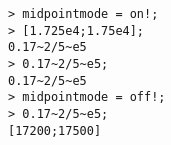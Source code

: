 \begin{center}\begin{minipage}{15cm}\begin{Verbatim}[frame=single]
> midpointmode = on!;
> [1.725e4;1.75e4];
0.17~2/5~e5
> 0.17~2/5~e5;
0.17~2/5~e5
> midpointmode = off!;
> 0.17~2/5~e5;
[17200;17500]
\end{Verbatim}
\end{minipage}\end{center}
